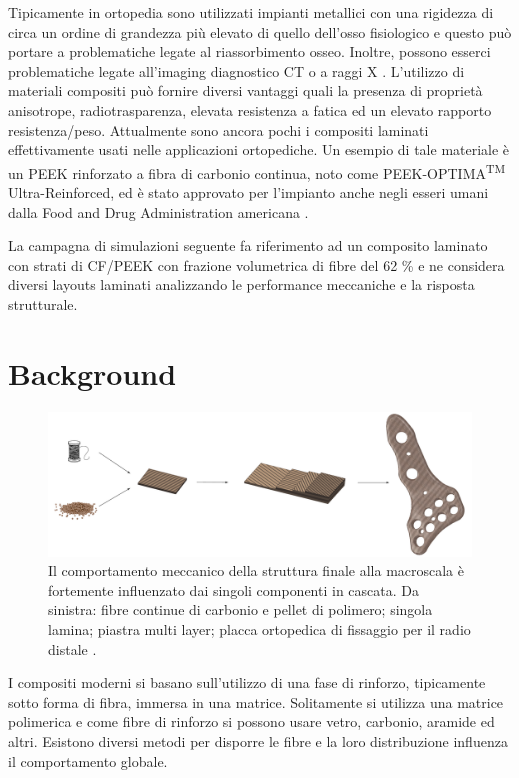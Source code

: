 \documentclass[a4paper,num-refs]{oup-contemporary}
\begin{document}
Tipicamente in ortopedia sono utilizzati impianti metallici con una rigidezza di circa un ordine di grandezza più elevato di quello dell'osso fisiologico e questo può portare a problematiche legate al riassorbimento osseo. Inoltre, possono esserci problematiche legate all'imaging diagnostico CT o a raggi X \citep{Rohner}. 
L'utilizzo di materiali compositi può fornire diversi vantaggi quali la presenza di proprietà anisotrope, radiotrasparenza, elevata resistenza a fatica ed un elevato rapporto resistenza/peso.  Attualmente sono ancora pochi i compositi laminati effettivamente usati nelle applicazioni ortopediche. Un esempio di tale materiale è un PEEK rinforzato a fibra di carbonio continua, noto come PEEK-OPTIMA\textsuperscript{TM}  Ultra-Reinforced, ed è stato approvato per l'impianto anche negli esseri umani dalla Food and Drug Administration americana \citep{PEEKOPTIMA}.

La campagna di simulazioni seguente fa riferimento ad un composito laminato con strati di CF/PEEK con frazione volumetrica di fibre del 62 \% e ne considera diversi layouts laminati analizzando le performance meccaniche e la risposta strutturale.  



\section{Background}

\begin{figure}[bt!]
	\includegraphics[width=\textwidth]{laminate_figures.pdf}
	\caption{Il comportamento meccanico della struttura finale alla macroscala è fortemente influenzato dai singoli componenti in cascata. Da sinistra: fibre continue di carbonio e pellet di polimero; singola lamina; piastra multi layer; placca ortopedica di fissaggio per il radio distale \citep{MUGNAI2018877,DISTAL}.}
\label{fig:laminates_general}
\end{figure}

I compositi moderni si basano sull'utilizzo di una fase di rinforzo, tipicamente sotto forma di fibra, immersa in una matrice. Solitamente si utilizza una matrice polimerica e come fibre di rinforzo si possono usare vetro, carbonio, aramide ed altri. Esistono diversi metodi per disporre le fibre e la loro distribuzione influenza il comportamento globale. 
\end{document}
